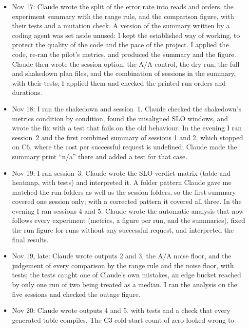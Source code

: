 \documentclass[10pt]{article}
\begin{document}
\begin{itemize}
  pilot results, including why the error rate with retries stayed near 1\%. I
  ran the pilot, the metrics, and the figures, compared the figures of Base and
  Retry under C4, and destroyed the stack.
  \item Nov 17: Claude wrote the split of the error rate into reads and orders,
  the experiment summary with the range rule, and the comparison figure, with
  their tests and a mutation check. A version of the summary written by a
  coding agent was set aside unused: I kept the established way of working, to
  protect the quality of the code and the pace of the project. I applied the code, re-ran the pilot's
  metrics, and produced the summary and the figure. Claude then wrote the
  session option, the A/A control, the dry run, the full and shakedown plan
  files, and the combination of sessions in the summary, with their tests; I
  applied them and checked the printed run orders and durations.
  \item Nov 18: I ran the shakedown and session~1. Claude checked the
  shakedown's metrics condition by condition, found the misaligned SLO
  windows, and wrote the fix with a test that fails on the old behaviour. In
  the evening I ran session~2 and the first combined summary of sessions 1 and
  2, which stopped on C6, where the cost per successful request is undefined;
  Claude made the summary print ``n/a'' there and added a test for that case.
  \item Nov 19: I ran session~3. Claude wrote the SLO verdict matrix (table and
  heatmap, with tests) and interpreted it. A folder pattern Claude gave me
  matched the run folders as well as the session folders, so the first summary
  covered one session only; with a corrected pattern it covered all three.
  In the evening I ran sessions 4 and 5. Claude wrote the automatic analysis
  that now follows every experiment (metrics, a figure per run, and the
  summaries), fixed the run figure for runs without any successful request, and
  interpreted the final results.
  \item Nov 19, late: Claude wrote outputs 2 and 3, the A/A noise floor, and
  the judgement of every comparison by the range rule and the noise floor, with
  tests; the tests caught one of Claude's own mistakes, an edge bucket reached
  by only one run of two being treated as a median. I ran the analysis on the
  five sessions and checked the outage figure.
  \item Nov 20: Claude wrote outputs 4 and 5, with tests and a check that every
  generated table compiles. The C3 cold-start count of zero looked wrong to

\end{itemize}
\end{document}
